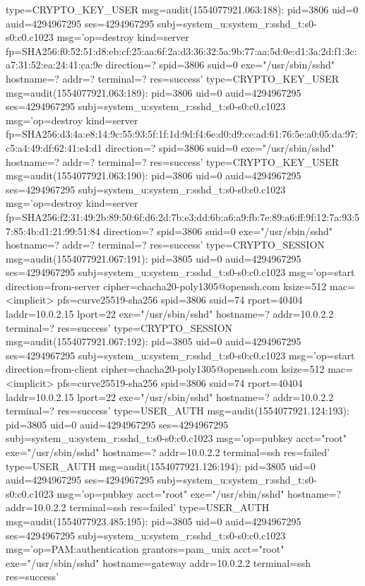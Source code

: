 \documentclass[]{report}
\newenvironment{Shaded}{}{}
\newcommand{\NormalTok}[1]{#1}
\begin{document}
\begin{Shaded}
\begin{Highlighting}[]
\NormalTok{type=CRYPTO_KEY_USER msg=audit(1554077921.063:188): pid=3806 uid=0 auid=4294967295 ses=4294967295 subj=system_u:system_r:sshd_t:s0-s0:c0.c1023 msg='op=destroy kind=server fp=SHA256:f0:52:51:d8:eb:cf:25:aa:6f:2a:d3:36:32:5a:9b:77:aa:5d:0e:d1:3a:2d:f1:3c:a7:31:52:ea:24:41:ca:9e direction=? spid=3806 suid=0  exe="/usr/sbin/sshd" hostname=? addr=? terminal=? res=success'}
\NormalTok{type=CRYPTO_KEY_USER msg=audit(1554077921.063:189): pid=3806 uid=0 auid=4294967295 ses=4294967295 subj=system_u:system_r:sshd_t:s0-s0:c0.c1023 msg='op=destroy kind=server fp=SHA256:d3:4a:e8:14:9c:55:93:5f:1f:1d:9d:f4:6e:d0:d9:ce:ad:61:76:5e:a0:05:da:97:c5:a4:49:df:62:41:e4:d1 direction=? spid=3806 suid=0  exe="/usr/sbin/sshd" hostname=? addr=? terminal=? res=success'}
\NormalTok{type=CRYPTO_KEY_USER msg=audit(1554077921.063:190): pid=3806 uid=0 auid=4294967295 ses=4294967295 subj=system_u:system_r:sshd_t:s0-s0:c0.c1023 msg='op=destroy kind=server fp=SHA256:f2:31:49:2b:89:50:6f:d6:2d:7b:e3:dd:6b:a6:a9:fb:7e:89:a6:ff:9f:12:7a:93:57:85:4b:d1:21:99:51:84 direction=? spid=3806 suid=0  exe="/usr/sbin/sshd" hostname=? addr=? terminal=? res=success'}
\NormalTok{type=CRYPTO_SESSION msg=audit(1554077921.067:191): pid=3805 uid=0 auid=4294967295 ses=4294967295 subj=system_u:system_r:sshd_t:s0-s0:c0.c1023 msg='op=start direction=from-server cipher=chacha20-poly1305@openssh.com ksize=512 mac=<implicit> pfs=curve25519-sha256 spid=3806 suid=74 rport=40404 laddr=10.0.2.15 lport=22  exe="/usr/sbin/sshd" hostname=? addr=10.0.2.2 terminal=? res=success'}
\NormalTok{type=CRYPTO_SESSION msg=audit(1554077921.067:192): pid=3805 uid=0 auid=4294967295 ses=4294967295 subj=system_u:system_r:sshd_t:s0-s0:c0.c1023 msg='op=start direction=from-client cipher=chacha20-poly1305@openssh.com ksize=512 mac=<implicit> pfs=curve25519-sha256 spid=3806 suid=74 rport=40404 laddr=10.0.2.15 lport=22  exe="/usr/sbin/sshd" hostname=? addr=10.0.2.2 terminal=? res=success'}
\NormalTok{type=USER_AUTH msg=audit(1554077921.124:193): pid=3805 uid=0 auid=4294967295 ses=4294967295 subj=system_u:system_r:sshd_t:s0-s0:c0.c1023 msg='op=pubkey acct="root" exe="/usr/sbin/sshd" hostname=? addr=10.0.2.2 terminal=ssh res=failed'}
\NormalTok{type=USER_AUTH msg=audit(1554077921.126:194): pid=3805 uid=0 auid=4294967295 ses=4294967295 subj=system_u:system_r:sshd_t:s0-s0:c0.c1023 msg='op=pubkey acct="root" exe="/usr/sbin/sshd" hostname=? addr=10.0.2.2 terminal=ssh res=failed'}
\NormalTok{type=USER_AUTH msg=audit(1554077923.485:195): pid=3805 uid=0 auid=4294967295 ses=4294967295 subj=system_u:system_r:sshd_t:s0-s0:c0.c1023 msg='op=PAM:authentication grantors=pam_unix acct="root" exe="/usr/sbin/sshd" hostname=gateway addr=10.0.2.2 terminal=ssh res=success'}

\end{Highlighting}
\end{Shaded}
\end{document}

